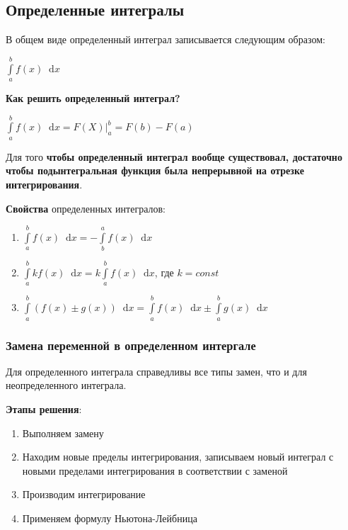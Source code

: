 \documentclass{article}
\newcommand*\diff{\mathop{}\!\mathrm{d}}
\begin{document}
\pagebreak
\subsection{Определенные интегралы}

В общем виде определенный интеграл записывается следующим образом:

$\int\limits_{a}^{b} f(x) \diff x$

\hfill

\textbf{Как решить определенный интеграл?}

$\int\limits_{a}^{b} f(x) \diff x = F(X) \bigg|_{a}^{b} = F(b) - F(a)$

Для того \textbf{чтобы определенный интеграл вообще существовал, достаточно чтобы подынтегральная функция была непрерывной на отрезке интегрирования}.

\hfill

\textbf{Свойства} определенных интегралов:

\begin{enumerate}
    \item $\int\limits_{a}^{b} f(x) \diff x = -\int\limits_{b}^{a} f(x) \diff x$
    \item $\int\limits_{a}^{b} k f(x) \diff x = k \int\limits_{a}^{b} f(x) \diff x$, где $k = const$
    \item $\int\limits_{a}^{b} (f(x) \pm g(x)) \diff x = \int\limits_{a}^{b} f(x) \diff x \pm \int\limits_{a}^{b} g(x) \diff x$
\end{enumerate}

\subsubsection{Замена переменной в определенном интергале}

Для определенного интеграла справедливы все типы замен, что и для неопределенного интеграла.

\textbf{Этапы решения}:

\begin{enumerate}
    \item Выполняем замену
    \item Находим новые пределы интегрирования, записываем новый интеграл с новыми пределами интегрирования в соответствии с заменой
    \item Производим интегрирование
    \item Применяем формулу Ньютона-Лейбница
\end{enumerate}
\end{document}
